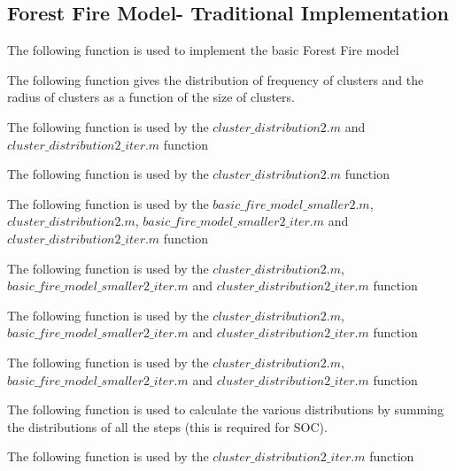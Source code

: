 \documentclass[11pt]{article}
\begin{document}


\begin{appendix}
\section{Forest Fire Model- Traditional Implementation}
The following function is used to implement the basic Forest Fire model


The following function gives the distribution of frequency of clusters and the radius of clusters as a function of the size of clusters.


The following function is used by the $cluster\_distribution2.m$ and $cluster\_distribution2\_iter.m$ function


The following function is used by the $cluster\_distribution2.m$ function


The following function is used by the $basic\_fire\_model\_smaller2.m$, $cluster\_distribution2.m$, $basic\_fire\_model\_smaller2\_iter.m$ and $cluster\_distribution2\_iter.m$ function


The following function is used by the $cluster\_distribution2.m$, $basic\_fire\_model\_smaller2\_iter.m$ and $cluster\_distribution2\_iter.m$ function


The following function is used by the $cluster\_distribution2.m$, $basic\_fire\_model\_smaller2\_iter.m$ and $cluster\_distribution2\_iter.m$ function


The following function is used by the $cluster\_distribution2.m$, $basic\_fire\_model\_smaller2\_iter.m$ and $cluster\_distribution2\_iter.m$ function


The following function is used to calculate the various distributions by summing the distributions of all the steps (this is required for SOC).


The following function is used by the $cluster\_distribution2\_iter.m$ function



\end{appendix}
\end{document}
